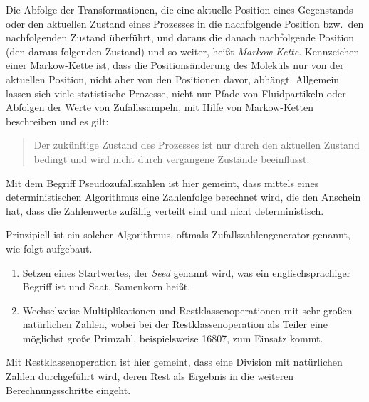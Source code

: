 Die Abfolge der Transformationen, die eine aktuelle Position eines Gegenstands oder den
aktuellen Zustand eines Prozesses in die nachfolgende Position bzw.\ den nachfolgenden
Zustand überführt, und daraus die danach nachfolgende Position (den daraus folgenden Zustand)
und so weiter, heißt \textsl{Markow-Kette}. Kennzeichen einer Markow-Kette ist, dass die 
Positions\-änder\-ung des Moleküls nur von der aktuellen Position,
nicht aber von den Positionen davor, abhängt. Allgemein lassen sich viele statistische Prozesse,
nicht nur Pfade von Fluidpartikeln oder Abfolgen der Werte von Zufallssampeln, mit Hilfe von
Markow-Ketten beschreiben und es gilt:
\begin{quote}
Der zukünftige Zustand des Prozesses ist nur durch den
aktuellen Zustand bedingt und wird nicht durch vergangene Zustände beeinflusst.
\end{quote}
Mit dem Begriff Pseudozufallszahlen ist hier gemeint, dass
mittels eines deterministischen Algorithmus eine Zahlenfolge berechnet wird, die den
Anschein hat, dass die Zahlenwerte zufällig verteilt sind und nicht deterministisch.

Prinzipiell ist ein solcher Algorithmus, oftmals Zufallszahlengenerator genannt, wie
folgt aufgebaut.
\begin{enumerate}
\item Setzen eines Startwertes, der \textsl{Seed} genannt wird, was ein englischsprachiger
  Begriff ist und Saat, Samenkorn heißt.
\item Wechselweise Multiplikationen und Restklassenoperationen mit sehr großen natürlichen Zahlen, wobei
  bei der Restklassenoperation als Teiler eine möglichst große Primzahl, beispielsweise
  16807, zum Einsatz kommt.
\end{enumerate}
Mit Restklassenoperation ist hier gemeint, dass eine Division mit natürlichen Zahlen
durchgeführt wird, deren Rest als Ergebnis in die weiteren Berechnungsschritte eingeht.


